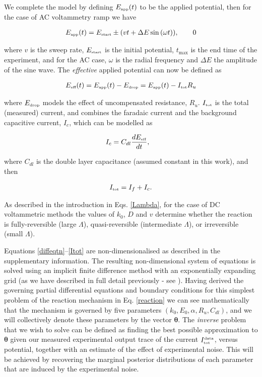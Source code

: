\documentclass[a4paper, 12pt]{article}
\begin{document}
We complete the model by defining $E_{\mbox{\tiny{app}}}(t)$ to be the applied 
potential, then for the case of AC voltammetry ramp we have

\begin{align}
E_{\mbox{\tiny{app}}}(t) =E_{\mbox{\tiny{start}}} \pm (v t + \Delta E \sin {(\omega t)}), \qquad 0   \label{EAC}
\end{align}

where $v$ is the sweep rate,  $E_{\mbox{\tiny{start}}}$ is the initial 
potential, $t_{\max}$ is the end time of the experiment, and for the AC case, 
$\omega$ is the radial frequency and  $\Delta E$ the amplitude of the sine wave.  
The {\em effective} applied potential can now be defined as 

\begin{align}
E_{\mbox{\tiny{eff}}}(t) = E_{\mbox{\tiny{app}}}(t) - E_{\mbox{\tiny{drop}}} = E_{\mbox{\tiny{app}}}(t) - I_{\mbox{\tiny{tot}}} R_u \nonumber
\end{align}

where $E_{\mbox{\tiny{drop}}}$ models the effect of uncompensated resistance, 
$R_u$. $I_{\mbox{\tiny{tot}}}$ is the total (measured) current, and combines the 
faradaic current and the background capacitive current, $I_c$, which can be 
modelled as   

\begin{align}
I_c &= C_{dl}\frac{dE_{\mbox{\tiny{eff}}}}{dt}, \label{Ic}
\end{align}

where $C_{dl}$ is the double layer capacitance (assumed constant in this work), and then 

\begin{align}
I_{\mbox{\tiny{tot}}} = I_f + I_c. \label{Itot}
\end{align}

As described in the introduction in Eqs. \ref{Lambda}, for the case of DC 
voltammetric methods the values of $k_0$, $D$ and $v$ determine whether the 
reaction is fully-reversible (large $\Lambda$), quasi-reversible (intermediate 
$\Lambda$), or irreversible (small $\Lambda$). 


Equations \ref{diffeqtn}--\ref{Itot} are non-dimensionalised as described in the 
supplementary information. The resulting non-dimensional system of equations is 
solved using an implicit finite difference method with an exponentially 
expanding grid (as we have described in full detail previously - see 
\cite{Sheretal}). Having derived the governing partial differential equations 
and boundary conditions for this simplest problem of the reaction mechanism in 
Eq. \ref{reaction} we can see mathematically that the mechanism is governed by 
five parameters $(k_0, E_0, \alpha, R_u, C_{dl})$, and we will collectively 
denote these parameters by the vector $ \boldsymbol\theta$. The {\em inverse} 
problem that we wish to solve can be defined as finding the best possible 
approximation to $\boldsymbol\theta$ given our measured experimental output 
trace of the current $I_{\mbox{\small{\tiny{tot}}}}^{\mbox{\tiny{data}}}$, 
versus potential, together with an estimate of the effect of experimental noise.  
This will be achieved by recovering the marginal posterior distributions of each 
parameter that are induced by the experimental noise.  
\end{document}
